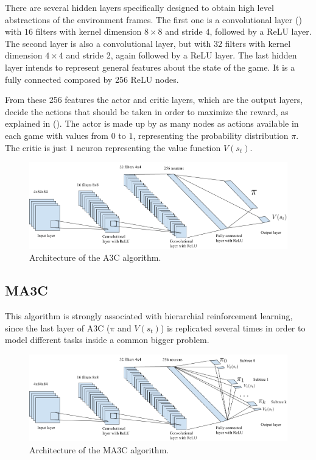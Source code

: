 There are several hidden layers specifically designed to obtain high level abstractions of the environment frames.
The first one is a convolutional layer () with $16$ filters with kernel dimension $8 \times 8$ and stride $4$,
followed by a \ac{ReLU} layer.
The second layer is also a convolutional layer, but with $32$ filters with kernel dimension $4 \times 4$ and stride 2,
again followed by a \ac{ReLU} layer.
The last hidden layer intends to represent general features about the state of the game.
It is a fully connected composed by 256 ReLU nodes.

From these 256 features the actor and critic layers, which are the output layers, decide the actions that should be taken
in order to maximize the reward, as explained in ().
The actor is made up by as many nodes as actions available in each game with values from $0$ to $1$, representing the
probability distribution $\pi$.
The critic is just $1$ neuron representing the value function $V(s_t)$.

\begin{figure}[hbtp]
\begin{center}
\includegraphics[width=430]{img/A3C_architecture.png}
\end{center}
\caption[A3C architecture]
{Architecture of the \ac{A3C} algorithm.}
\label{fig:A3C}
\end{figure}

\subsection{\acl{MA3C}\label{subsec:MA3C}}

This algorithm is strongly associated with hierarchial reinforcement learning, since the last layer of \ac{A3C}
($\pi$ and $V(s_t)$) is replicated several times in order to model different tasks inside a common bigger problem.

\begin{figure}[hbtp]
\begin{center}
\includegraphics[width=430]{img/MA3C_architecture.png}
\end{center}
\caption[MA3C architecture]
{Architecture of the \ac{MA3C} algorithm.}
\label{fig:MA3C}
\end{figure}


